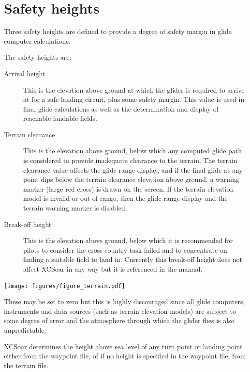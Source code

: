 \section{Safety heights}\label{sec:safety-heights}

Three safety heights are defined to provide a degree of safety margin
in glide computer calculations.  

The safety heights are:
\begin{description}
\item[Arrival height]  This is the elevation above ground at which
 the glider is required to arrive at for a safe landing circuit, plus
 some safety margin.  This value is used in final glide calculations as
 well as the determination and display of reachable landable fields.
\item[Terrain clearance]
 This is the elevation above ground, below which any computed glide
 path is considered to provide inadequate clearance to the terrain.
 The terrain clearance value affects the glide range display, and if
 the final glide at any point dips below the terrain clearance
 elevation above ground, a warning marker (large red cross) is drawn
 on the screen.  If the terrain elevation model is invalid or out of
 range, then the glide range display and the terrain warning marker is
 disabled.
\item[Break-off height]  This is the elevation above ground, below which 
 it is recommended for pilots to consider the cross-country task
 failed and to concentrate on finding a suitable field to land in.
 Currently this break-off height does not affect XCSoar in any way but
 it is referenced in the manual.
\end{description}

\begin{maxipage}
\begin{center}
\texttt{[image: figures/figure\_terrain.pdf]}
\end{center}
\end{maxipage}

\warning
These may be set to zero but this is highly discouraged since all
glide computers, instruments and data sources (such as terrain
elevation models) are subject to some degree of error and the
atmosphere through which the glider flies is also unpredictable.

XCSoar determines the height above sea level of any turn point or
landing point either from the waypoint file, of if no height is
specified in the waypoint file, from the terrain file.

